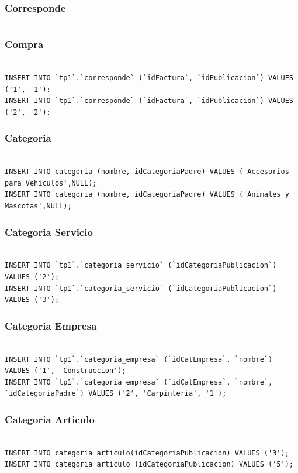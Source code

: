 \documentclass[a4paper, 10pt, twoside]{article}
\begin{document}
\subsubsection{Corresponde}
\begin{verbatim}

\end{verbatim}
\subsubsection{Compra}
\begin{verbatim}

INSERT INTO `tp1`.`corresponde` (`idFactura`, `idPublicacion`) VALUES ('1', '1');
INSERT INTO `tp1`.`corresponde` (`idFactura`, `idPublicacion`) VALUES ('2', '2');
\end{verbatim}
\subsubsection{Categoria}
\begin{verbatim}

INSERT INTO categoria (nombre, idCategoriaPadre) VALUES ('Accesorios para Vehiculos',NULL);
INSERT INTO categoria (nombre, idCategoriaPadre) VALUES ('Animales y Mascotas',NULL);
\end{verbatim}
\subsubsection{Categoria Servicio}
\begin{verbatim}

INSERT INTO `tp1`.`categoria_servicio` (`idCategoriaPublicacion`) VALUES ('2');
INSERT INTO `tp1`.`categoria_servicio` (`idCategoriaPublicacion`) VALUES ('3');
\end{verbatim}
\subsubsection{Categoria Empresa}
\begin{verbatim}

INSERT INTO `tp1`.`categoria_empresa` (`idCatEmpresa`, `nombre`) VALUES ('1', 'Construccion');
INSERT INTO `tp1`.`categoria_empresa` (`idCatEmpresa`, `nombre`, `idCategoriaPadre`) VALUES ('2', 'Carpinteria', '1');
\end{verbatim}
\subsubsection{Categoria Articulo}
\begin{verbatim}

INSERT INTO categoria_articulo(idCategoriaPublicacion) VALUES ('3');
INSERT INTO categoria_articulo (idCategoriaPublicacion) VALUES ('5');
\end{verbatim}
\end{document}
